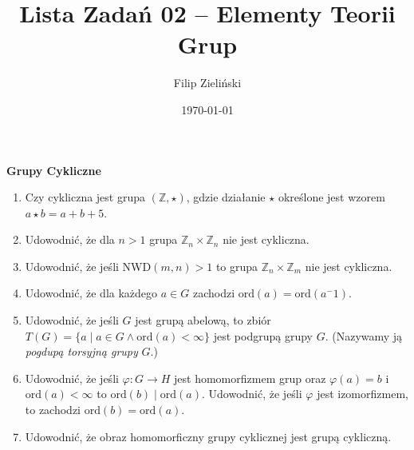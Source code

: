 \documentclass{article}
\title{Lista Zadań 02 --  Elementy Teorii Grup}
\author{Filip Zieliński}
\date{\today}
\newcommand{\ord}{\textrm{ord}}
\let\phi\varphi
\begin{document}
\maketitle

 \textbf{Grupy Cykliczne} 
\begin{enumerate}
    \item Czy cykliczna jest grupa $(\mathbb{Z}, \star)$, gdzie działanie $\star$ określone jest wzorem $a \star b = a + b + 5$.
    \item Udowodnić, że dla $n > 1$ grupa $\mathbb{Z}_n \times \mathbb{Z}_n$ nie jest cykliczna.
    \item Udowodnić, że jeśli NWD$(m,n) > 1$ to grupa $\mathbb{Z}_n \times \mathbb{Z}_m$ nie jest cykliczna.
    \item Udowodnić, że dla każdego $a \in G$ zachodzi $\ord (a) = \ord (a^-1)$.
    \item Udowodnić, że jeśli $G$ jest grupą abelową, to zbiór $T(G) = \{ a \mid a \in G \land \ord (a) < \infty \}$ jest podgrupą grupy $G$. (Nazywamy ją \textit{pogdupą torsyjną grupy} $G$.)
    \item Udowodnić, że jeśli $\phi : G \rightarrow H$ jest homomorfizmem grup oraz $\phi (a) = b$ i $\ord (a) < \infty$ to $\ord (b) \mid \ord (a)$. Udowodnić, że jeśli $\phi$ jest izomorfizmem, to zachodzi $\ord (b) = \ord (a)$. 
    \item Udowodnić, że obraz homomorficzny grupy cyklicznej jest grupą cykliczną.
\end{enumerate}
\end{document}
